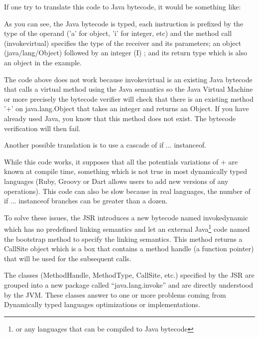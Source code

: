 \documentclass{sig-alternate}
\def \Jsr{JSR\xspace}
\def \JVM{JVM\xspace}
\begin{document}
      If one try to translate this code to Java bytecode, it would be something like:

      

      As you can see, the Java bytecode is typed, each instruction is prefixed 
      by the type of the operand ('a' for object, 'i' for integer, etc)
      and the method call (invokevirtual) specifies the type of the receiver and its parameters;
      an object (java/lang/Object) followed by an integer (I) ; and its return type
      which is also an object in the example.

      The code above does not work because invokevirtual is an existing Java bytecode that calls
      a virtual method using the Java semantics so the Java Virtual Machine or more precisely
      the bytecode verifier will check that there is an existing method '+' on java.lang.Object
      that takes an integer and returns an Object. If you have already used Java, you know
      that this method does not exist. The bytecode verification will then fail.

      Another possible translation is to use a cascade of if ... instanceof.

      

      While this code works, it supposes that all the potentials variations of + are known at compile time,
      something which is not true in most dynamically typed languages (Ruby, Groovy or Dart allows users to add
      new versions of any operations).
      This code can also be slow because in real languages, the number of if ... instanceof branches
      can be greater than a dozen. 

      To solve these issues, the \Jsr introduces a new bytecode named invokedynamic which has no predefined
      linking semantics and let an external Java\footnote{or any languages that can be compiled to Java bytecode} code
      named the bootstrap method to specify the linking semantics.
      This method returns a CallSite object which is a box that contains a method handle (a function pointer)
      that will be used for the subsequent calls.

      The classes (MethodHandle, MethodType, CallSite, etc.) specified by the \Jsr are grouped into a new
      package called ``java.lang.invoke'' and are directly understood by the \JVM.
      These classes answer to one or more problems coming from Dynamically typed languages optimizations or implementations.
\end{document}
